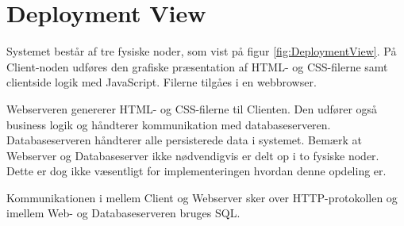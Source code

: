 \section{Deployment View}
Systemet består af tre fysiske noder, som vist på figur \ref{fig:DeploymentView}. På Client-noden udføres den grafiske præsentation af HTML- og CSS-filerne samt clientside logik med JavaScript. Filerne tilgåes i en webbrowser.

Webserveren genererer HTML- og CSS-filerne til Clienten. Den udfører også business logik og håndterer kommunikation med databaseserveren.
Databaseserveren håndterer alle persisterede data i systemet.
Bemærk at Webserver og Databaseserver ikke nødvendigvis er delt op i to fysiske noder. Dette er dog ikke væsentligt for implementeringen hvordan denne opdeling er.

Kommunikationen i mellem Client og Webserver sker over HTTP-protokollen og imellem Web- og Databaseserveren bruges SQL.

